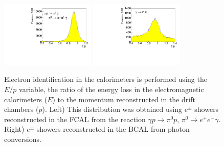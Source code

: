 \begin{figure}[tbp]
\begin{center}
\includegraphics[width=0.4\textwidth]{figures/fcal_ep.pdf}
\includegraphics[width=0.4\textwidth]{figures/bcal_ep.pdf}
\caption{\label{fig:performeop}
Electron identification in the calorimeters is performed using the $E/p$ variable, the ratio of the energy loss in the electromagnetic calorimeters ($E$) to the momentum reconstructed in the drift chambers ($p$).  Left) This distribution was obtained using $e^{\pm}$ showers reconstructed in the FCAL from the reaction $\gamma p \to \pi^0 p$, $\pi^0\to e^+e^-\gamma$. Right) $e^{\pm}$ showers reconstructed in the BCAL from photon conversions.
}
\end{center}
\end{figure}  



